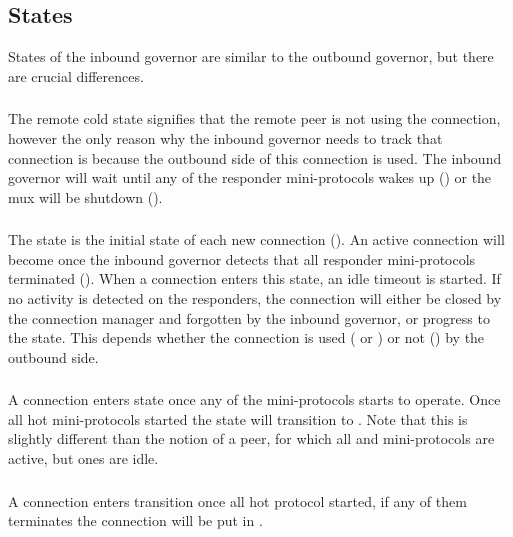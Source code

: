 \subsection{States}

States of the inbound governor are similar to the outbound governor, but there
are crucial differences.

\subsubsection{\RemoteCold}
The remote cold state signifies that the remote peer is not using the
connection, however the only reason why the inbound governor needs to track
that connection is because the outbound side of this connection is used.  The
inbound governor will wait until any of the responder mini-protocols wakes up
(\AwakeRemote{}) or the mux will be shutdown (\MuxTerminated{}).

\subsubsection{\RemoteIdle}
The \RemoteIdle{} state is the initial state of each new connection
(\NewConnection{}).  An active connection will become \RemoteIdle{} once the
inbound governor detects that all responder mini-protocols terminated
(\WaitIdleRemote{}).  When a connection enters this state, an idle timeout is
started.  If no activity is detected on the responders, the connection will
either be closed by the connection manager and forgotten by the inbound
governor, or progress to the \RemoteCold{} state.  This depends whether the
connection is used (\warm{} or \hot{}) or not (\cold{}) by the outbound side.

\subsubsection{\RemoteWarm}
A connection enters \RemoteWarm{} state once any of the mini-protocols starts
to operate.  Once all hot mini-protocols started the state will transition to
\RemoteHot{}.  Note that this is slightly different than the notion of a \warm{}
peer, for which all \established{} and \warm{} mini-protocols are active, but
\hot{} ones are idle.

\subsubsection{\RemoteHot}
A connection enters \RemoteHot{} transition once all hot protocol started, if
any of them terminates the connection will be put in \RemoteWarm{}.

